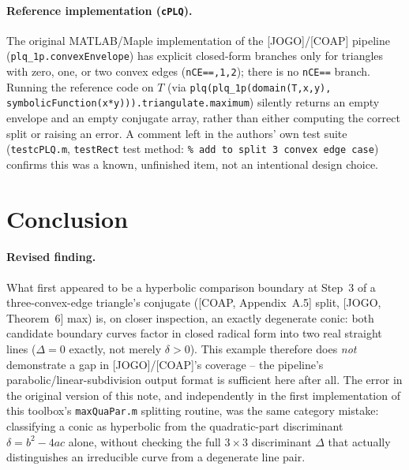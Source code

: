 \documentclass[11pt]{article}
\begin{document}
\paragraph{Reference implementation (\texttt{cPLQ}).} The original MATLAB/Maple
implementation of the [JOGO]/[COAP] pipeline (\texttt{plq\_1p.convexEnvelope})
has explicit closed-form branches only for triangles with zero, one, or two
convex edges (\texttt{nCE\;==,1,2}); there is no \texttt{nCE\;==} branch.
Running the reference code on $T$ (via \texttt{plq(plq\_1p(domain(T,x,y),
symbolicFunction(x*y))).triangulate.maximum}) silently returns an empty
envelope and an empty conjugate array, rather than either computing the
correct split or raising an error. A comment left in the authors' own test
suite (\texttt{testcPLQ.m}, \texttt{testRect} test method: \texttt{\% add to
split 3 convex edge case}) confirms this was a known, unfinished item, not an
intentional design choice.

\section{Conclusion}

\paragraph{Revised finding.} What first appeared to be a hyperbolic
comparison boundary at Step~3 of a three-convex-edge triangle's conjugate
([COAP, Appendix~A.5] split, [JOGO, Theorem~6] max) is, on closer inspection,
an exactly degenerate conic: both candidate boundary curves factor in closed
radical form into two real straight lines ($\Delta=0$ exactly, not merely
$\delta>0$). This example therefore does \emph{not} demonstrate a gap in
[JOGO]/[COAP]'s coverage -- the pipeline's parabolic/linear-subdivision
output format is sufficient here after all. The error in the original
version of this note, and independently in the first implementation of this
toolbox's \texttt{maxQuaPar.m} splitting routine, was the same category
mistake: classifying a conic as hyperbolic from the quadratic-part
discriminant $\delta=b^2-4ac$ alone, without checking the full $3\times3$
discriminant $\Delta$ that actually distinguishes an irreducible curve from a
degenerate line pair.
\end{document}
